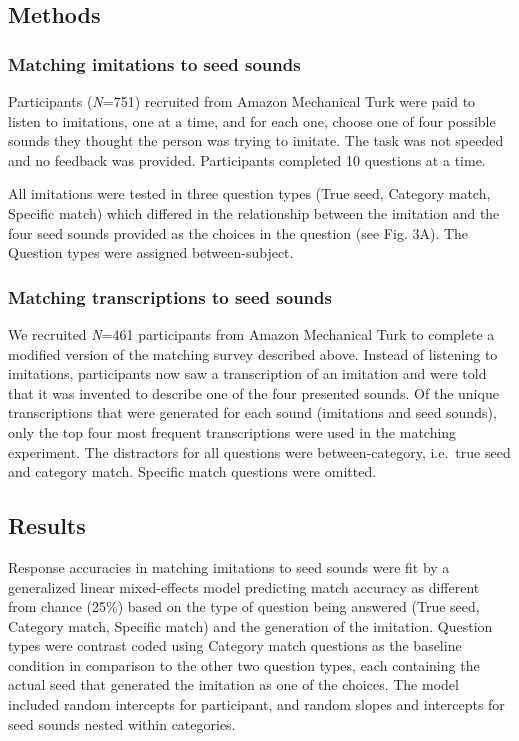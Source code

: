 \documentclass[english,floatsintext,man]{apa6}
\theoremstyle{definition}
\theoremstyle{definition}
\theoremstyle{definition}
\theoremstyle{remark}
\begin{document}
\hypertarget{methods-1}{%
\subsection{Methods}\label{methods-1}}

\hypertarget{matching-imitations-to-seed-sounds}{%
\subsubsection{Matching imitations to seed
sounds}\label{matching-imitations-to-seed-sounds}}

Participants (\emph{N}=751) recruited from Amazon Mechanical Turk were
paid to listen to imitations, one at a time, and for each one, choose
one of four possible sounds they thought the person was trying to
imitate. The task was not speeded and no feedback was provided.
Participants completed 10 questions at a time.

All imitations were tested in three question types (True seed, Category
match, Specific match) which differed in the relationship between the
imitation and the four seed sounds provided as the choices in the
question (see Fig. 3A). The Question types were assigned
between-subject.

\hypertarget{matching-transcriptions-to-seed-sounds}{%
\subsubsection{Matching transcriptions to seed
sounds}\label{matching-transcriptions-to-seed-sounds}}

We recruited \emph{N}=461 participants from Amazon Mechanical Turk to
complete a modified version of the matching survey described above.
Instead of listening to imitations, participants now saw a transcription
of an imitation and were told that it was invented to describe one of
the four presented sounds. Of the unique transcriptions that were
generated for each sound (imitations and seed sounds), only the top four
most frequent transcriptions were used in the matching experiment. The
distractors for all questions were between-category, i.e.~true seed and
category match. Specific match questions were omitted.

\hypertarget{results-1}{%
\subsection{Results}\label{results-1}}

Response accuracies in matching imitations to seed sounds were fit by a
generalized linear mixed-effects model predicting match accuracy as
different from chance (25\%) based on the type of question being
answered (True seed, Category match, Specific match) and the generation
of the imitation. Question types were contrast coded using Category
match questions as the baseline condition in comparison to the other two
question types, each containing the actual seed that generated the
imitation as one of the choices. The model included random intercepts
for participant, and random slopes and intercepts for seed sounds nested
within categories.
\end{document}
